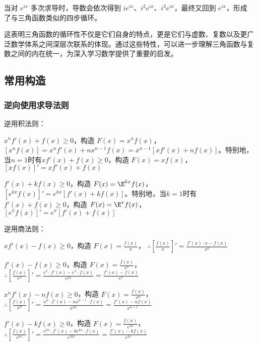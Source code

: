 当对 $e^{ix}$ 多次求导时，导数会依次得到 $ie^{ix}$、$i^2e^{ix}$、$i^3e^{ix}$，最终又回到 $e^{ix}$，形成了与三角函数类似的四步循环。

这表明三角函数的循环性不仅是它们自身的特点，更是它们与虚数、复数以及更广泛数学体系之间深层次联系的体现。通过这些特性，可以进一步理解三角函数与复数之间的内在统一，为深入学习数学提供了重要的启发。
\subsection{常用构造}


\subsubsection{逆向使用求导法则}

逆用积法则：

$x^n f'(x) + f(x) \geq 0$，构造 $F(x) = x^n f(x)$，$[x^n f(x)] = x^n f'(x) + nx^{n-1} f(x) = x^{n-1} [x f'(x) + nf(x)]$。特别地，当$n=1$时有$x f'(x) + f(x) \geq 0$，构造 $F(x) = x f(x)$，$[x f(x)]' = x f'(x) + f(x)$

$f'(x) + k f(x) \geq 0$，构造 $F(x) = \E^{kx} f(x)$，$[e^{kx} f(x)]' = e^{kx} [f'(x) + kf(x)]$。特别地，当$k=1$时有$f'(x) + f(x) \geq 0$，构造 $F(x) = \E^x f(x)$，$[e^x f(x)]' = e^x [f'(x) + f(x)]$

逆用商法则：

$xf'(x) - f(x) \geq 0$，构造 $F(x) = \frac{f(x)}{x}$，  
    $\therefore \left[\frac{f(x)}{x}\right]' = \frac{f'(x) \cdot x - f(x)}{x^2}$

$f'(x) - f(x) \geq 0$，构造 $F(x) = \frac{f(x)}{e^x}$，  
    $\therefore \left[\frac{f(x)}{e^x}\right]' = \frac{e^x \cdot f'(x) - e^x \cdot f(x)}{e^{2x}} = \frac{f'(x) - f(x)}{e^x}$

$x^n f'(x) - n f(x) \geq 0$，构造 $F(x) = \frac{f(x)}{x^n}$，  
    $\therefore \left[\frac{f(x)}{x^n}\right]' = \frac{x^n \cdot f'(x) - n x^{n-1} \cdot f(x)}{x^{2n}} = \frac{f'(x) - n f(x)}{x^{n+1}}$

$f'(x) - k f(x) \geq 0$，构造 $F(x) = \frac{f(x)}{e^{kx}}$，  
    $\therefore \left[\frac{f(x)}{e^{kx}}\right]' = \frac{e^{kx} \cdot f'(x) - k e^{kx} \cdot f(x)}{e^{2kx}} = \frac{f'(x) - k f(x)}{e^{kx}}$
